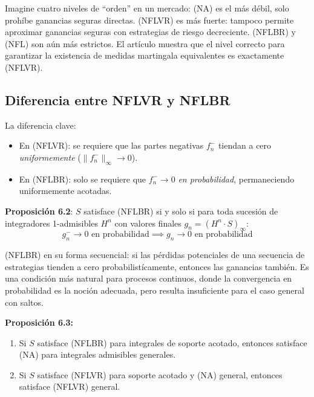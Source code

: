 \documentclass[12pt]{article}
\begin{document}
\begin{intuicion}
Imagine cuatro niveles de ``orden'' en un mercado: (NA) es el m\'as d\'ebil, solo proh\'ibe ganancias seguras directas. (NFLVR) es m\'as fuerte: tampoco permite aproximar ganancias seguras con estrategias de riesgo decreciente. (NFLBR) y (NFL) son a\'un m\'as estrictos. El art\'iculo muestra que el nivel correcto para garantizar la existencia de medidas martingala equivalentes es exactamente (NFLVR).
\end{intuicion}

\subsection{Diferencia entre NFLVR y NFLBR}

La diferencia clave:
\begin{itemize}
    \item En (NFLVR): se requiere que las partes negativas $f_n^-$ tiendan a cero \emph{uniformemente} ($\|f_n^-\|_\infty \to 0$).
    \item En (NFLBR): solo se requiere que $f_n^- \to 0$ \emph{en probabilidad}, permaneciendo uniformemente acotadas.
\end{itemize}

\textbf{Proposici\'on 6.2}: $S$ satisface (NFLBR) si y solo si para toda sucesi\'on de integradores 1-admisibles $H^n$ con valores finales $g_n = (H^n \cdot S)_\infty$:
\begin{equation}
    g_n^- \to 0 \text{ en probabilidad} \implies g_n \to 0 \text{ en probabilidad}
\end{equation}

\begin{intuicionmat}
(NFLBR) en su forma secuencial: si las p\'erdidas potenciales de una secuencia de estrategias tienden a cero probabilist\'icamente, entonces las ganancias tambi\'en. Es una condici\'on m\'as natural para procesos continuos, donde la convergencia en probabilidad es la noci\'on adecuada, pero resulta insuficiente para el caso general con saltos.
\end{intuicionmat}

\textbf{Proposici\'on 6.3:}
\begin{enumerate}
    \item Si $S$ satisface (NFLBR) para integrales de soporte acotado, entonces satisface (NA) para integrales admisibles generales.
    \item Si $S$ satisface (NFLVR) para soporte acotado y (NA) general, entonces satisface (NFLVR) general.
\end{enumerate}
\end{document}
